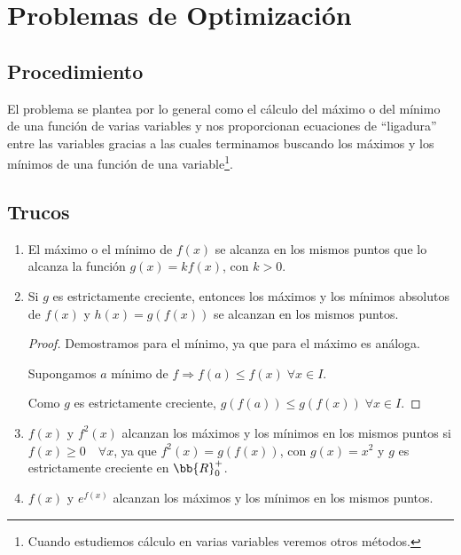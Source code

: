 \section{Problemas de Optimización}

\subsection*{Procedimiento}
El problema se plantea por lo general como el cálculo del máximo o del mínimo de una función de varias variables y nos proporcionan ecuaciones de ``ligadura'' entre las variables gracias a las cuales terminamos buscando los máximos y los mínimos de una función de una variable\footnote{Cuando estudiemos cálculo en varias variables veremos otros métodos.}. 

\subsection*{Trucos}
\begin{enumerate}
    \item El máximo o el mínimo de $f(x)$ se alcanza en los mismos puntos que lo alcanza la función $g(x)=kf(x)$, con $k>0$.

    \item Si $g$ es estrictamente creciente, entonces los máximos y los mínimos absolutos de $f(x)$ y $h(x)=g(f(x))$ se alcanzan en los mismos puntos.
    \begin{proof}
    Demostramos para el mínimo, ya que para el máximo es análoga.
    
        Supongamos $a$ mínimo de $f \Longrightarrow f(a) \leq f(x)\;\forall x\in I$.

        Como $g$ es estrictamente creciente, $g(f(a)) \leq g(f(x))\; \forall x\in I$.
    \end{proof}

    \item $f(x)$ y $f^2(x)$ alcanzan los máximos y los mínimos en los mismos puntos si $f(x)\geq 0\quad \forall x$, ya que $f^2(x)=g(f(x))$, con $g(x)=x^2$ y $g$ es estrictamente creciente en $\bb{R}^+_0$.

    \item $f(x)$ y $e^{f(x)}$ alcanzan los máximos y los mínimos en los mismos puntos.
\end{enumerate}

